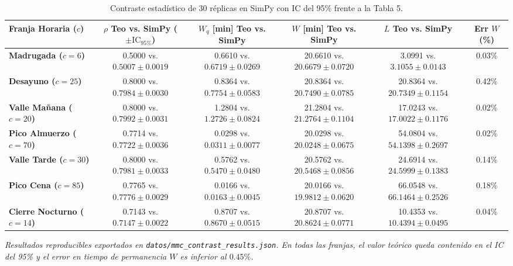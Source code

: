\documentclass[11pt,letterpaper]{article}
\begin{document}
\begin{table}[htbp]
\centering
\small
\caption{Contraste estadístico de 30 réplicas en SimPy con IC del 95\% frente a la Tabla 5.}
\begin{tabularx}{\textwidth}{l c c c c c}
\toprule
\textbf{Franja Horaria ($c$)} & $\rho$ Teo vs. SimPy ($\pm \text{IC}_{95\%}$) & $W_q$ [min] Teo vs. SimPy & $W$ [min] Teo vs. SimPy & $L$ Teo vs. SimPy & Err $W$ (\%) \\
\midrule
\textbf{Madrugada ($c=6$)} & 0.5000 vs. $0.5007 \pm 0.0019$ & 0.6610 vs. $0.6719 \pm 0.0269$ & 20.6610 vs. $20.6679 \pm 0.0720$ & 3.0991 vs. $3.1055 \pm 0.0143$ & 0.03\% \\
\textbf{Desayuno ($c=25$)} & 0.8000 vs. $0.7984 \pm 0.0030$ & 0.8364 vs. $0.7754 \pm 0.0583$ & 20.8364 vs. $20.7490 \pm 0.0785$ & 20.8364 vs. $20.7349 \pm 0.1154$ & 0.42\% \\
\textbf{Valle Mañana ($c=20$)} & 0.8000 vs. $0.7992 \pm 0.0031$ & 1.2804 vs. $1.2726 \pm 0.0824$ & 21.2804 vs. $21.2764 \pm 0.1104$ & 17.0243 vs. $17.0022 \pm 0.1176$ & 0.02\% \\
\textbf{Pico Almuerzo ($c=70$)} & 0.7714 vs. $0.7722 \pm 0.0036$ & 0.0298 vs. $0.0311 \pm 0.0077$ & 20.0298 vs. $20.0248 \pm 0.0675$ & 54.0804 vs. $54.1398 \pm 0.2697$ & 0.02\% \\
\textbf{Valle Tarde ($c=30$)} & 0.8000 vs. $0.7981 \pm 0.0033$ & 0.5762 vs. $0.5470 \pm 0.0480$ & 20.5762 vs. $20.5468 \pm 0.0856$ & 24.6914 vs. $24.5999 \pm 0.1383$ & 0.14\% \\
\textbf{Pico Cena ($c=85$)} & 0.7765 vs. $0.7776 \pm 0.0029$ & 0.0166 vs. $0.0163 \pm 0.0045$ & 20.0166 vs. $19.9812 \pm 0.0620$ & 66.0548 vs. $66.1464 \pm 0.2526$ & 0.18\% \\
\textbf{Cierre Nocturno ($c=14$)} & 0.7143 vs. $0.7147 \pm 0.0022$ & 0.8707 vs. $0.8670 \pm 0.0515$ & 20.8707 vs. $20.8624 \pm 0.0771$ & 10.4353 vs. $10.4394 \pm 0.0495$ & 0.04\% \\
\bottomrule
\end{tabularx}
\vspace{0.2em}
\raggedright \footnotesize \textit{Resultados reproducibles exportados en \texttt{datos/mmc\_contrast\_results.json}. En todas las franjas, el valor teórico queda contenido en el IC del 95\% y el error en tiempo de permanencia $W$ es inferior al $0.45\%$.}
\end{table}
\end{document}
